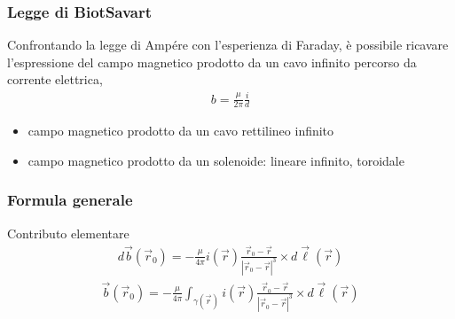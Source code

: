 \documentclass[letterpaper,10pt,italian]{jupyterBook}
\begin{document}
\subsubsection{Legge di Biot\sphinxhyphen{}Savart}
\label{\detokenize{ch/electromagnetism/electromagnetism-steady:legge-di-biot-savart}}
\sphinxAtStartPar
Confrontando la legge di Ampére con l’esperienza di Faraday, è possibile ricavare l’espressione del campo magnetico prodotto da un cavo infinito percorso da corrente elettrica,
\begin{equation*}
\begin{split}b = \frac{\mu}{2 \pi} \frac{i}{d}\end{split}
\end{equation*}
\sphinxAtStartPar
{}
\begin{itemize}
\item {} 
\sphinxAtStartPar
campo magnetico prodotto da un cavo rettilineo infinito

\item {} 
\sphinxAtStartPar
campo magnetico prodotto da un solenoide: lineare infinito, toroidale

\end{itemize}


\subsubsection{Formula generale}
\label{\detokenize{ch/electromagnetism/electromagnetism-steady:formula-generale}}
\sphinxAtStartPar
Contributo elementare
\begin{equation*}
\begin{split}d \vec{b}(\vec{r}_0) = - \frac{\mu}{4 \pi} i(\vec{r}) \frac{ \vec{r}_0 - \vec{r} }{| \vec{r}_0 - \vec{r} |^3} \times d \vec{\ell}(\vec{r})\end{split}
\end{equation*}\begin{equation*}
\begin{split}\vec{b}(\vec{r}_0) = - \frac{\mu}{4 \pi} \int_{\gamma(\vec{r})} i(\vec{r})  \frac{ \vec{r}_0 - \vec{r} }{| \vec{r}_0 - \vec{r} |^3}\times d \vec{\ell}(\vec{r})\end{split}
\end{equation*}
\end{document}
